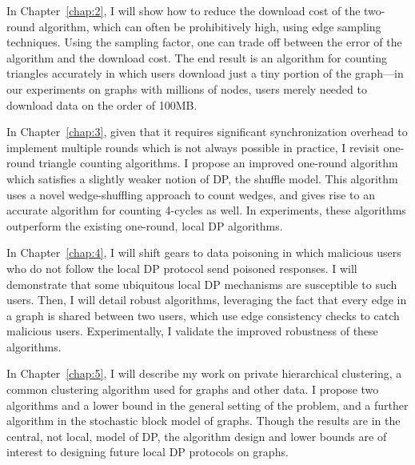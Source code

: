 \documentclass[12pt]{ucsddissertation}
\begin{document}
\begin{dissertationintroduction}
In Chapter~\ref{chap:2}, I will show how to reduce the download cost of the two-round algorithm, 
which can often be prohibitively high, using edge sampling techniques. Using the sampling factor,
one can trade off between the error of the algorithm and the download cost. The end 
result is an algorithm for counting triangles accurately in which users download just a tiny 
portion of the graph---in our experiments on graphs with millions of nodes, users merely
needed to download data on the order of 100MB.

In Chapter~\ref{chap:3}, given that it requires significant 
synchronization overhead to implement multiple rounds which is not always possible in practice,
I revisit one-round triangle counting algorithms. 
I propose an improved one-round algorithm which satisfies a slightly weaker
notion of DP, the shuffle model. This algorithm uses a novel wedge-shuffling approach
to count wedges, and gives rise to an accurate algorithm for counting 
4-cycles as well. In experiments, these algorithms outperform the existing one-round, local DP 
algorithms.

In Chapter~\ref{chap:4}, I will shift gears to data poisoning in which
malicious users who do not follow the local DP protocol send poisoned responses. 
I will demonstrate that some ubiquitous local DP mechanisms are susceptible to such users.
Then, I will detail robust algorithms, 
leveraging the fact that every edge in a graph is shared between two users, which use 
edge consistency checks to catch malicious users. Experimentally, I validate the 
improved robustness of these algorithms.

In Chapter~\ref{chap:5}, I will describe my work on private hierarchical clustering,
a common clustering algorithm used for graphs and other data. I propose two algorithms and 
a lower bound in the general setting of the problem, and a further algorithm in the stochastic 
block model of graphs. Though the results are in the central, not local, model of DP, the algorithm 
design and lower bounds are of interest to designing future local DP protocols on graphs.

\end{dissertationintroduction}







\appendix






\backmatter

\end{document}
